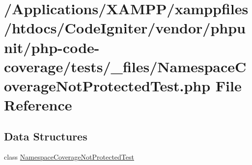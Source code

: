\hypertarget{php-code-coverage_2tests_2__files_2_namespace_coverage_not_protected_test_8php}{}\section{/\+Applications/\+X\+A\+M\+P\+P/xamppfiles/htdocs/\+Code\+Igniter/vendor/phpunit/php-\/code-\/coverage/tests/\+\_\+files/\+Namespace\+Coverage\+Not\+Protected\+Test.php File Reference}
\label{php-code-coverage_2tests_2__files_2_namespace_coverage_not_protected_test_8php}
\subsection*{Data Structures}
\begin{DoxyCompactItemize}
\item 
class \mbox{\hyperlink{class_namespace_coverage_not_protected_test}{Namespace\+Coverage\+Not\+Protected\+Test}}
\end{DoxyCompactItemize}

